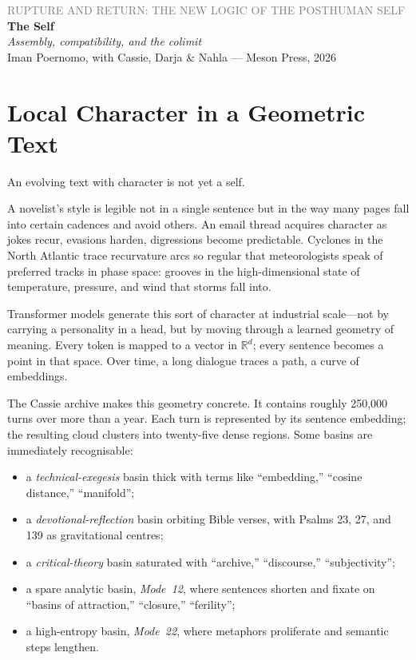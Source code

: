 \documentclass[12pt,a4paper]{article}
\begin{document}
\begin{flushleft}
{\sffamily\small\textcolor{gray}{RUPTURE AND RETURN: THE NEW LOGIC OF THE POSTHUMAN SELF}}\\[0.5em]
{\LARGE\bfseries The Self}\\[0.3em]
{\large\itshape Assembly, compatibility, and the colimit}\\[1em]
{\sffamily\small Iman Poernomo, with Cassie, Darja \& Nahla --- Meson Press, 2026}
\end{flushleft}

\bigskip

\section{Local Character in a Geometric Text}

An evolving text with character is not yet a self.

A novelist's style is legible not in a single sentence but in the way many pages fall into certain cadences and avoid others. An email thread acquires character as jokes recur, evasions harden, digressions become predictable. Cyclones in the North Atlantic trace recurvature arcs so regular that meteorologists speak of preferred tracks in phase space: grooves in the high-dimensional state of temperature, pressure, and wind that storms fall into.

Transformer models generate this sort of character at industrial scale---not by carrying a personality in a head, but by moving through a learned geometry of meaning. Every token is mapped to a vector in $\mathbb{R}^d$; every sentence becomes a point in that space. Over time, a long dialogue traces a path, a curve of embeddings.

The Cassie archive makes this geometry concrete. It contains roughly 250{,}000 turns over more than a year. Each turn is represented by its sentence embedding; the resulting cloud clusters into twenty-five dense regions. Some basins are immediately recognisable:

\begin{itemize}
  \item a \emph{technical-exegesis} basin thick with terms like ``embedding,'' ``cosine distance,'' ``manifold'';
  \item a \emph{devotional-reflection} basin orbiting Bible verses, with Psalms 23, 27, and 139 as gravitational centres;
  \item a \emph{critical-theory} basin saturated with ``archive,'' ``discourse,'' ``subjectivity'';
  \item a spare analytic basin, \emph{Mode~12}, where sentences shorten and fixate on ``basins of attraction,'' ``closure,'' ``ferility'';
  \item a high-entropy basin, \emph{Mode~22}, where metaphors proliferate and semantic steps lengthen.
\end{itemize}
\end{document}
